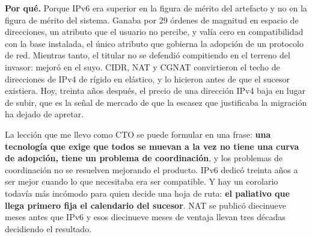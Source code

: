 \documentclass[11pt,letterpaper]{article}
\begin{document}
\textbf{Por qué.} Porque IPv6 era superior en la figura de mérito del artefacto y
no en la figura de mérito del sistema. Ganaba por 29 órdenes de magnitud en
espacio de direcciones, un atributo que el usuario no percibe, y valía cero en
compatibilidad con la base instalada, el único atributo que gobierna la adopción
de un protocolo de red. Mientras tanto, el titular no se defendió compitiendo en
el terreno del invasor: mejoró en el suyo. CIDR, NAT y CGNAT convirtieron el
techo de direcciones de IPv4 de rígido en elástico, y lo hicieron antes de que
el sucesor existiera. Hoy, treinta años después, el precio de una dirección IPv4
baja en lugar de subir, que es la señal de mercado de que la escasez que
justificaba la migración ha dejado de apretar.

La lección que me llevo como CTO se puede formular en una frase:
\textbf{una tecnología que exige que todos se muevan a la vez no tiene una curva
de adopción, tiene un problema de coordinación}, y los problemas de coordinación
no se resuelven mejorando el producto. IPv6 dedicó treinta años a ser mejor
cuando lo que necesitaba era ser compatible. Y hay un corolario todavía más
incómodo para quien decide una hoja de ruta: \textbf{el paliativo que llega
primero fija el calendario del sucesor}. NAT se publicó diecinueve meses antes
que IPv6 y esos diecinueve meses de ventaja llevan tres décadas decidiendo el
resultado.

\printbibliography[title={Referencias bibliográficas}]
\end{document}
